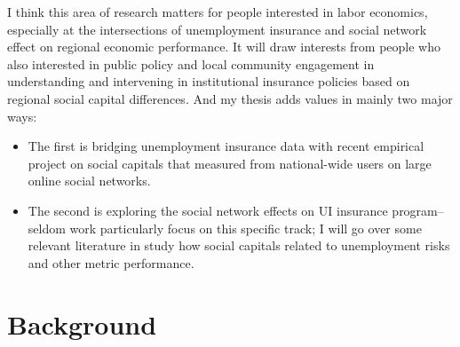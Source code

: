 \documentclass{article}
\begin{document}
I think this area of research matters for people interested in labor economics, especially at the intersections of unemployment insurance and social network effect on regional economic performance. It will draw interests from people who also interested in public policy and local community engagement in understanding and intervening in institutional insurance policies based on regional social capital differences. And my thesis adds values in mainly two major ways: 
\begin{itemize}
\item The first is bridging unemployment insurance data with recent empirical project on social capitals that measured from national-wide users on large online social networks.

\item The second is exploring the social network effects on UI insurance program--seldom work particularly focus on this specific track; I will go over some relevant literature in study how social capitals related to unemployment risks and other metric performance.
 
\end{itemize}



\section{Background}
\end{document}

